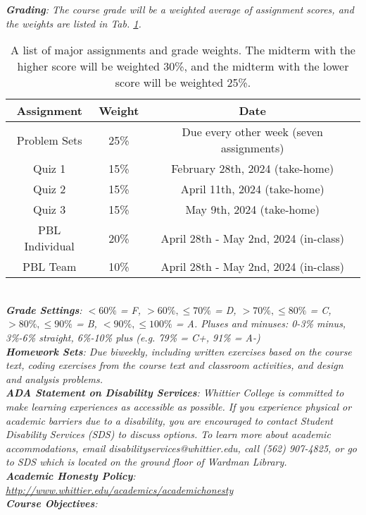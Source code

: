 \documentclass[10pt]{article}
\begin{document}
\textit{\textbf{Grading}: The course grade will be a weighted average of assignment scores, and the weights are listed in Tab. \ref{tab:grading}.}
\begin{table}[hb]
\centering
\begin{tabular}{| c | c | c |}
\hline
\textbf{Assignment} & \textbf{Weight} & \textbf{Date} \\ \hline
Problem Sets & 25\% & Due every other week (seven assignments) \\ \hline
Quiz 1 & 15\% & February 28th, 2024 (take-home) \\ \hline
Quiz 2 & 15\% & April 11th, 2024 (take-home) \\ \hline
Quiz 3 & 15\% & May 9th, 2024 (take-home) \\ \hline
PBL Individual & 20\% & April 28th - May 2nd, 2024 (in-class) \\ \hline
PBL Team & 10\% & April 28th - May 2nd, 2024 (in-class) \\ \hline
\end{tabular}
\caption{\label{tab:grading} A list of major assignments and grade weights.  The midterm with the higher score will be weighted 30\%, and the midterm with the lower score will be weighted 25\%.}
\end{table} \\
\textit{\textbf{Grade Settings}: $<60\%$ = F, $>60\%,\leq 70\%$ = D, $>70\%,\leq80\%$ = C, $>80\%,\leq 90\%$ = B, $<90\%,\leq 100\%$ = A.  Pluses and minuses: 0-3\% minus, 3\%-6\% straight, 6\%-10\% plus (e.g. 79\% = C+, 91\% = A-)} \\
\textit{\textbf{Homework Sets}: Due biweekly, including written exercises based on the course text, coding exercises from the course text and classroom activities, and design and analysis problems.} \\
\textit{\textbf{ADA Statement on Disability Services}: Whittier College is committed to make learning experiences as accessible as possible. If you experience physical or academic barriers due to a disability, you are encouraged to contact Student Disability Services (SDS) to discuss options. To learn more about academic accommodations, email disabilityservices@whittier.edu, call (562) 907-4825, or go to SDS which is located on the ground floor of Wardman Library.} \\
\textit{\textbf{Academic Honesty Policy}: \url{http://www.whittier.edu/academics/academichonesty}} \\
\textit{\textbf{Course Objectives}:}
\end{document}
